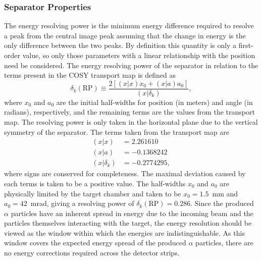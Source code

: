 \subsubsection{Separator Properties}
The energy resolving power is the minimum energy difference required to resolve
a peak from the central image peak assuming that the change in energy is the
only difference between the two peaks. By definition this quantity is only a
first-order value, so only those parameters with a linear relationship with the
position need be considered. The energy resolving power of the separator
in relation to the terms present in the COSY transport map is defined as
\begin{equation}
    \delta_k(\textrm{RP}) \equiv
        \frac{2\left[(x|x)x_0 + (x|a)a_0\right]}{(x|\delta_k)},
\end{equation}
where $x_0$ and $a_0$ are the initial half-widths for position (in meters) and
angle (in radians), respectively, and the remaining terms are the values from
the transport map. The resolving power is only taken in the horizontal plane
due to the vertical symmetry of the separator. The terms taken from the
transport map are
\begin{align*}
    (x|x) &= 2.261610 \\
    (x|a) &= {-0.1368242} \\
    (x|\delta_k) &= {-0.2774295},
\end{align*}
where signs are conserved for completeness. The maximal deviation caused by
each terms is taken to be a positive value. The half-widths $x_0$ and $a_0$ are
physically limited by the target chamber and taken to be $x_0 = 1.5$~mm and
$a_0 = 42$~mrad, giving a resolving power of $\delta_k(\textrm{RP}) = 0.286$.
Since the produced $\alpha$ particles have an inherent spread in energy due to
the incoming beam and the particles themselves interacting with the target, the
energy resolution should be viewed as the window within which the energies are
indistinguishable. As this window covers the expected energy spread of the
produced $\alpha$ particles, there are no energy corrections required across
the detector strips.


